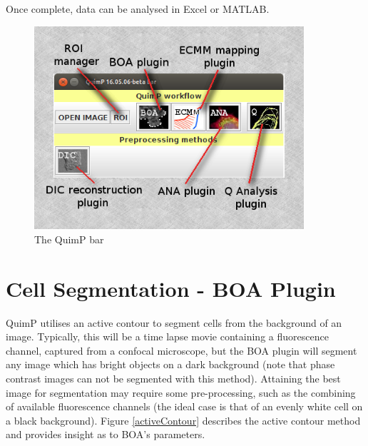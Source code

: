 \documentclass[a4paper,12pt]{article}
\begin{document}
Once complete, data can be analysed in Excel or MATLAB.

\begin{figure}[ht]
   \centering
   \includegraphics[width=10cm]{quimpBar.png} %
   \caption{The QuimP bar}
   \label{quimpBar}
\end{figure}


\section{Cell Segmentation - BOA Plugin}

QuimP utilises an active contour to segment cells from the background of an image.  Typically, this will be a 
time lapse movie containing a fluorescence channel, captured from a confocal microscope, but the BOA plugin will 
segment any image which has bright objects on a dark background (note that phase contrast images can not be 
segmented with this method).  Attaining the best image for segmentation may require some pre-processing, such 
as the combining of available fluorescence channels (the ideal case is that of an evenly white cell on a black 
background).  Figure \ref{activeContour} describes the active contour method and provides insight as to BOA's 
parameters.\\
\end{document}
